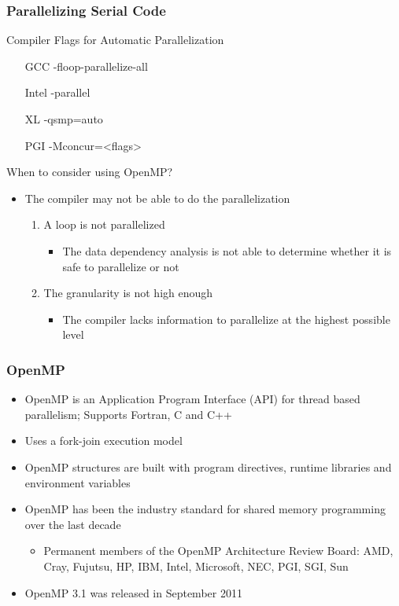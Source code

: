 \documentclass[c,mathserif,compress,xcolor=svgnames]{beamer}
\newenvironment{bblock}[0]
{
\begin{beamerboxesrounded}[upper=uppercol1,lower=lowercol1,shadow=true]}
{\end{beamerboxesrounded}}
\newenvironment{eblock}[0]
{
\begin{beamerboxesrounded}[upper=uppercol2,lower=lowercol2,shadow=true]}
{\end{beamerboxesrounded}}
\begin{document}
\begin{frame}
  \frametitle{\small Parallelizing Serial Code}
  \begin{eblock}{Compiler Flags for Automatic Parallelization}
    \begin{itemize}
      \item[GCC] -floop-parallelize-all
      \item[Intel] -parallel
      \item[XL] -qsmp=auto
      \item[PGI] -Mconcur=<flags>
    \end{itemize}
  \end{eblock}
  \begin{bblock}{When to consider using OpenMP?}
    \begin{itemize}
      \item The compiler may not be able to do the parallelization
      \begin{enumerate}
        \item A loop is not parallelized
        \begin{itemize}
          \item The data dependency analysis is not able to determine whether it is safe to parallelize or not
        \end{itemize}
        \item The granularity is not high enough
        \begin{itemize}
          \item The compiler lacks information to parallelize at the highest possible level
        \end{itemize}
      \end{enumerate}
    \end{itemize}
  \end{bblock}
\end{frame}

\begin{frame}
  \frametitle{\small OpenMP}
  \begin{bblock}{}
    \begin{itemize}
      \item OpenMP is an Application Program Interface (API) for thread based parallelism; Supports Fortran, C and C++
      \item Uses a fork-join execution model
      \item OpenMP structures are built with program directives, runtime libraries and environment variables
      \item OpenMP has been the industry standard for shared memory programming over the last decade
      \begin{itemize}
        \item Permanent members of the OpenMP Architecture Review Board: AMD, Cray, Fujutsu, HP, IBM, Intel, Microsoft, NEC, PGI, SGI, Sun
      \end{itemize}
      \item OpenMP 3.1 was released in September 2011
    \end{itemize}
  \end{bblock}
\end{frame}
\end{document}
